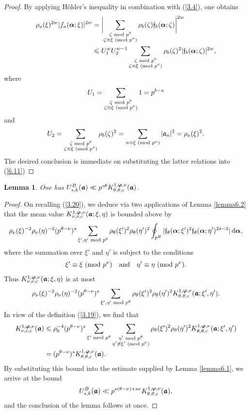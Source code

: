 \documentclass[12pt,reqno]{amsart}
\newtheorem{lemma}[theorem]{Lemma}
\theoremstyle{definition}
\theoremstyle{remark}
\numberwithin{equation}{section}
\newcommand{\mmod}[1]{\,\,(\text{\rm mod}\,\,#1)}
\newcommand{\nmod}[1]{\,\,\text{\rm mod}\,\,#1}
\def\gra{{\mathfrak a}}\def\grA{{\mathfrak A}}\def\bfgra{{\boldsymbol \gra}}
\def\grf{{\mathfrak f}}\def\grF{{\mathfrak F}}
\def\zet{{\zeta}} \def\bfzet{{\boldsymbol \zeta}} \def\zetbar{{\overline \zet}}
\def\tet{{\theta}} \def\bftet{{\boldsymbol \theta}}
\def\le{\leqslant} \def\ge{\geqslant} \def\pleq{\preccurlyeq} \def\ple{\prec}
\def\d{{\,{\rm d}}}
\begin{document}
\begin{proof} By applying H\"older's inequality in combination with (\ref{3.4}), one obtains
\begin{align}
\rho_a(\xi)^{2w}|f_a(\bfalp;\xi)|^{2w}&=\biggl| \sum_{\substack{\zet\nmod{p^b}\\ 
\zet\equiv \xi\mmod{p^a}}}\rho_b(\zet)\grf_b(\bfalp;\zet)\biggr|^{2w}\notag \\
&\le U_1^wU_2^{w-1}\sum_{\substack{\zet\nmod{p^b}\\ \zet\equiv \xi\mmod{p^a}}}
\rho_b(\zet)^2|\grf_b(\bfalp;\zet)|^{2w},\label{6.11}
\end{align}
where
$$U_1=\sum_{\substack{\zet\nmod{p^b}\\ \zet\equiv \xi\mmod{p^a}}}1=p^{b-a}$$
and
$$U_2=\sum_{\substack{\zet\nmod{p^b}\\ \zet\equiv \xi\mmod{p^a}}}
\rho_b(\zet)^2=\sum_{n\equiv \xi\mmod{p^a}}|\gra_n|^2=\rho_a(\xi)^2.$$
The desired conclusion is immediate on substituting the latter relations into (\ref{6.11})
\end{proof}

\begin{lemma}\label{lemma6.3} One has $U_{s,k}^B(\bfgra)\ll p^{s\tet}
K_{\tet,\tet,c}^{1,\bfvarphi,\nu}(\bfgra)$.
\end{lemma}

\begin{proof} On recalling (\ref{3.20}), we deduce via two applications of Lemma 
\ref{lemma6.2} that the mean value $K_{\nu,\nu,c}^{1,\bfvarphi,\nu}(\bfgra;\xi,\eta)$ is 
bounded above by
$$\rho_\nu(\xi)^{-2}\rho_\nu(\eta)^{-2}(p^{\tet-\nu})^s
\sum_{\xi',\eta'\nmod{p^\tet}}\rho_\tet(\xi')^2\rho_\tet(\eta')^2
\oint_{p^B}|\grf_\tet(\bfalp;\xi')^2\grf_\tet(\bfalp;\eta')^{2s-2}|\d\bfalp ,$$
where the summation over $\xi'$ and $\eta'$ is subject to the conditions
$$\xi'\equiv\xi\mmod{p^\nu}\quad \text{and}\quad \eta'\equiv \eta \mmod{p^\nu}.$$
Thus $K_{\nu,\nu,c}^{1,\bfvarphi,\nu}(\bfgra;\xi,\eta)$ is at most
$$\rho_\nu(\xi)^{-2}\rho_\nu(\eta)^{-2}(p^{\tet-\nu})^s\sum_{\xi',\eta'\nmod{p^\tet}}
\rho_\tet(\xi')^2\rho_\tet(\eta')^2K_{\tet,\tet,c}^{1,\bfvarphi,\nu}(\bfgra;\xi',\eta').$$
In view of the definition (\ref{3.19}), we find that
\begin{align*}
K_{\nu,\nu,c}^{1,\bfvarphi,\nu}(\bfgra)&\le \rho_0^{-4}(p^{\tet-\nu})^s
\sum_{\xi'\nmod{p^\tet}}\sum_{\substack{\eta'\nmod{p^\tet}\\ \eta'\not \equiv \xi' 
\mmod{p^\nu}}}\rho_\tet(\xi')^2\rho_\tet(\eta')^2K_{\tet,\tet,c}^{1,\bfvarphi,\nu}
(\bfgra;\xi',\eta')\\
&=(p^{\tet-\nu})^sK_{\tet,\tet,c}^{1,\bfvarphi,\nu}(\bfgra).
\end{align*}
By substituting this bound into the estimate supplied by Lemma \ref{lemma6.1}, we arrive 
at the bound
$$U_{s,k}^B(\bfgra)\ll p^{s(\tet-\nu)+s\nu}K_{\tet,\tet,c}^{1,\bfvarphi,\nu}(\bfgra),$$
and the conclusion of the lemma follows at once.
\end{proof}
\end{document}
